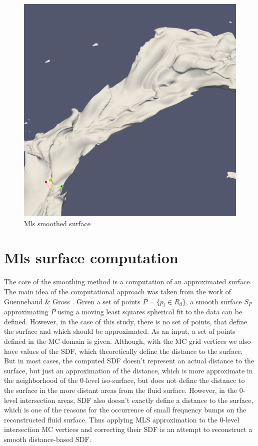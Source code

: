 \begin{figure}
	\begin{center}
		\includegraphics[width=\textwidth]{figures/CanionMls1.png}
	\end{center}
	\caption{Mls smoothed surface}
	\label{fig:mls_motivation}
\end{figure}
\section{Mls surface computation}

The core of the smoothing method is a computation of an approximated surface. 
The main idea of the computational approach was taken from the work of Guennebaud \& Gross \cite{Apss}. 
Given a set of points $P = \{p_i \in R_d \}$, a smooth surface $S_P$ approximating $P$ using a moving least squares spherical fit to the data can be defined. However, in the case of this study, there is no set of points, that define the surface and which should be approximated. As an input, a set of points defined in the MC domain is given. 
Although, with the MC grid vertices we also have values of the SDF, which theoretically define the distance to the surface. But in most cases, the computed SDF doesn't represent an actual distance to the surface, but just an approximation of the distance, which is more approximate in the neighborhood of the 0-level iso-surface, but does not define the distance to the surface in the more distant areas from the fluid surface. 
However, in the 0-level intersection areas, SDF also doesn't exactly define a distance to the surface, which is one of the reasons for the occurrence of small frequency bumps on the reconstructed fluid surface. Thus applying MLS approximation to the 0-level intersection MC vertices and correcting their SDF is an attempt to reconstruct a smooth distance-based SDF.

